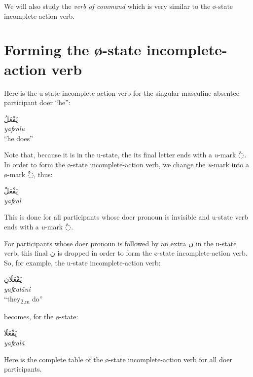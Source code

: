 \documentclass[
  10pt,
]{book}
\begin{document}
We will also study the \emph{verb of command} which is very similar to the
ø-state
incomplete-action verb.

\section{Forming the ø-state incomplete-action verb}\label{forming-the-0-state-incomplete-action-verb}

Here is the u-state incomplete action verb for the singular masculine absentee participant doer \enquote{he}:

\foreignlanguage{arabic}{يَفْعَلُ}\\
\emph{yafɛalu}\\
\enquote{he does}

Note that, because it is in the u-state, the its final letter ends with a \emph{u}-mark \foreignlanguage{arabic}{◌ُ}.
In order to form the
ø-state
incomplete-action verb,
we change the \emph{u}-mark into a
ø-mark \foreignlanguage{arabic}{◌ْ}, thus:

\foreignlanguage{arabic}{يَفْعَلْ}\\
\emph{yafɛal}

This is done for all participants whose doer pronoun is invisible and u-state verb ends with a \emph{u}-mark \foreignlanguage{arabic}{◌ُ}.

For participants whose doer pronoun is followed by an extra \foreignlanguage{arabic}{ن} in the u-state verb, this final \foreignlanguage{arabic}{ن} is dropped in order to form the
ø-state
incomplete-action verb.
So, for example, the u-state
incomplete-action verb:

\foreignlanguage{arabic}{يَفْعَلَانِ}\\
\emph{yafɛalāni}\\
\enquote{they\textsubscript{2,m} do}

becomes, for the
ø-state:

\foreignlanguage{arabic}{يَفْعَلَا}\\
\emph{yafɛalā}

Here is the complete table of the
ø-state
incomplete-action verb
for all doer participants.
\end{document}
